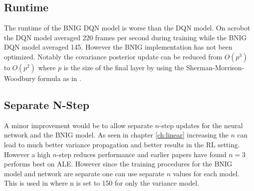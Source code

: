 \subsection{Runtime}

The runtime of the BNIG DQN model is worse than the DQN model. On acrobot the DQN model averaged 220 frames per second during training while the BNIG DQN model averaged 145. However the BNIG implementation has not been optimized. Notably the covariance posterior update can be reduced from $O(p^3)$ to $O(p^2)$ where $p$ is the size of the final layer by using the Sherman-Morrison-Woodbury formula as in \cite{donoghue_2017}. 

\subsection{Separate N-Step}

A minor improvement would be to allow separate $n$-step updates for the neural network and the BNIG model. As seen in chapter \ref{ch:linear} increasing the $n$ can lead to much better variance propagation and better results in the RL setting. However a high $n$-step reduces performance and earlier papers have found $n=3$ performs best on ALE\citep{hessel_2017}. However since the training procedures for the BNIG model and network are separate one can use separate $n$ values for each model. This is used in \cite{donoghue_2017} where n is set to 150 for only the variance model.

\cleardoublepage